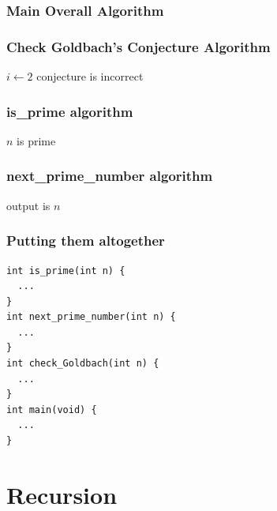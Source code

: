 \documentclass{../c-lecture}
\begin{document}
\begin{frame}[fragile]
  \frametitle{Main Overall Algorithm}
  \begin{algorithm}[H]
  \end{algorithm}
\end{frame}

\begin{frame}[fragile]
  \frametitle{Check Goldbach's Conjecture Algorithm}
  \begin{algorithm}[H]
  $i \gets 2$\;
  conjecture is incorrect
  \end{algorithm}
\end{frame}

\begin{frame}
  \frametitle{is\_prime algorithm}
  \begin{algorithm}[H]
  $n$ is prime\;
  \end{algorithm}
\end{frame}

\begin{frame}[fragile]
  \frametitle{next\_prime\_number algorithm}
  \begin{algorithm}[H]
  output is $n$\;
  \end{algorithm}
\end{frame}

\begin{frame}[fragile]
  \frametitle{Putting them altogether}
  \begin{verbatim}
int is_prime(int n) {
  ...
}
int next_prime_number(int n) {
  ...
}
int check_Goldbach(int n) {
  ...
}
int main(void) {
  ...
}
  \end{verbatim}
\end{frame}

\section{Recursion}
\end{document}
